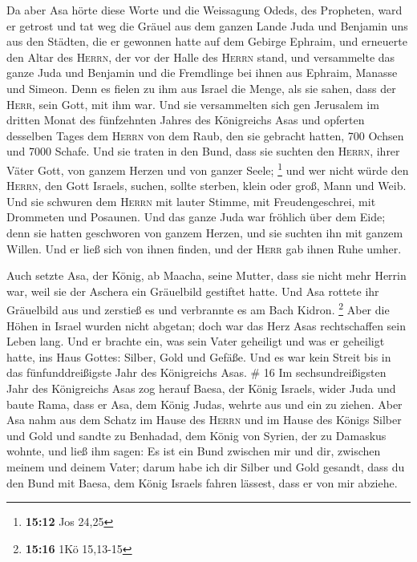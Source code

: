  Da aber Asa hörte diese Worte und die Weissagung Odeds,
des Propheten, ward er getrost und tat weg die Gräuel aus dem ganzen
Lande Juda und Benjamin uns aus den Städten, die er gewonnen hatte auf
dem Gebirge Ephraim, und erneuerte den Altar des \textsc{Herrn}, der vor
der Halle des \textsc{Herrn} stand,  und versammelte das
ganze Juda und Benjamin und die Fremdlinge bei ihnen aus Ephraim,
Manasse und Simeon. Denn es fielen zu ihm aus Israel die Menge, als sie
sahen, dass der \textsc{Herr}, sein Gott, mit ihm war. 
Und sie versammelten sich gen Jerusalem im dritten Monat des fünfzehnten
Jahres des Königreichs Asas  und opferten desselben Tages
dem \textsc{Herrn} von dem Raub, den sie gebracht hatten, 700 Ochsen und
7000 Schafe.  Und sie traten in den Bund, dass sie
suchten den \textsc{Herrn}, ihrer Väter Gott, von ganzem Herzen und von
ganzer Seele; \footnote{\textbf{15:12} Jos 24,25}  und
wer nicht würde den \textsc{Herrn}, den Gott Israels, suchen, sollte
sterben, klein oder groß, Mann und Weib.  Und sie
schwuren dem \textsc{Herrn} mit lauter Stimme, mit Freudengeschrei, mit
Drommeten und Posaunen.  Und das ganze Juda war fröhlich
über dem Eide; denn sie hatten geschworen von ganzem Herzen, und sie
suchten ihn mit ganzem Willen. Und er ließ sich von ihnen finden, und
der \textsc{Herr} gab ihnen Ruhe umher.

 Auch setzte Asa, der König, ab Maacha, seine Mutter,
dass sie nicht mehr Herrin war, weil sie der Aschera ein Gräuelbild
gestiftet hatte. Und Asa rottete ihr Gräuelbild aus und zerstieß es und
verbrannte es am Bach Kidron. \footnote{\textbf{15:16} 1Kö 15,13-15}
 Aber die Höhen in Israel wurden nicht abgetan; doch war
das Herz Asas rechtschaffen sein Leben lang.  Und er
brachte ein, was sein Vater geheiligt und was er geheiligt hatte, ins
Haus Gottes: Silber, Gold und Gefäße.  Und es war kein
Streit bis in das fünfunddreißigste Jahr des Königreichs Asas. \# 16
 Im sechsundreißigsten Jahr des Königreichs Asas zog
herauf Baesa, der König Israels, wider Juda und baute Rama, dass er Asa,
dem König Judas, wehrte aus und ein zu ziehen.  Aber Asa
nahm aus dem Schatz im Hause des \textsc{Herrn} und im Hause des Königs
Silber und Gold und sandte zu Benhadad, dem König von Syrien, der zu
Damaskus wohnte, und ließ ihm sagen:  Es ist ein Bund
zwischen mir und dir, zwischen meinem und deinem Vater; darum habe ich
dir Silber und Gold gesandt, dass du den Bund mit Baesa, dem König
Israels fahren lässest, dass er von mir abziehe.

